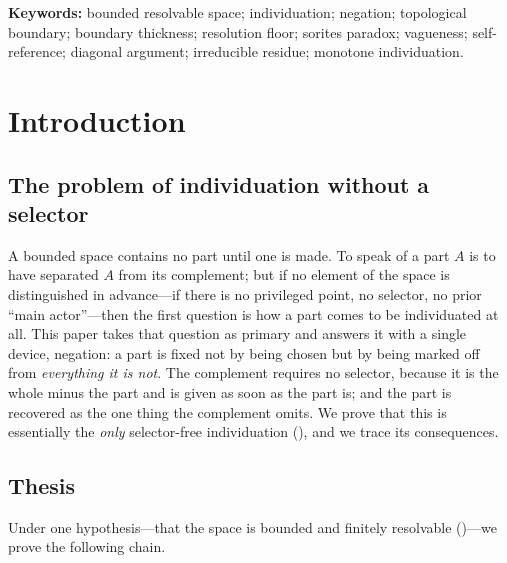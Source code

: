 \documentclass[11pt,a4paper]{article}
\theoremstyle{thmstyle}
\theoremstyle{definition}
\theoremstyle{remark}
\begin{document}
\noindent\textbf{Keywords:} bounded resolvable space; individuation;
negation; topological boundary; boundary thickness; resolution floor; sorites
paradox; vagueness; self-reference; diagonal argument; irreducible residue;
monotone individuation.

\tableofcontents

\section{Introduction}
\label{sec:intro}

\subsection{The problem of individuation without a selector}

A bounded space contains no part until one is made. To speak of a part $A$ is
to have separated $A$ from its complement; but if no element of the space is
distinguished in advance---if there is no privileged point, no selector, no
prior ``main actor''---then the first question is how a part comes to be
individuated at all. This paper takes that question as primary and answers it
with a single device, negation: a part is fixed not by being chosen but by
being marked off from \emph{everything it is not}. The complement requires no
selector, because it is the whole minus the part and is given as soon as the
part is; and the part is recovered as the one thing the complement omits. We
prove that this is essentially the \emph{only} selector-free individuation
(), and we trace its consequences.

\subsection{Thesis}

Under one hypothesis---that the space is bounded and finitely resolvable
()---we prove the following chain.
\end{document}
